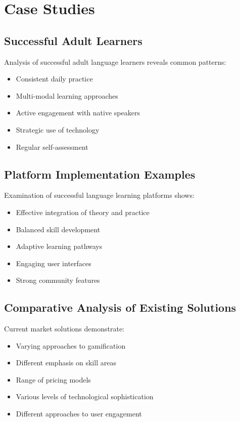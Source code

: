 \section{Case Studies}
\subsection{Successful Adult Learners}
Analysis of successful adult language learners reveals common patterns:
\begin{itemize}
    \item Consistent daily practice
    \item Multi-modal learning approaches
    \item Active engagement with native speakers
    \item Strategic use of technology
    \item Regular self-assessment
\end{itemize}

\subsection{Platform Implementation Examples}
Examination of successful language learning platforms shows:
\begin{itemize}
    \item Effective integration of theory and practice
    \item Balanced skill development
    \item Adaptive learning pathways
    \item Engaging user interfaces
    \item Strong community features
\end{itemize}

\subsection{Comparative Analysis of Existing Solutions}
Current market solutions demonstrate:
\begin{itemize}
    \item Varying approaches to gamification
    \item Different emphasis on skill areas
    \item Range of pricing models
    \item Various levels of technological sophistication
    \item Different approaches to user engagement
\end{itemize} 